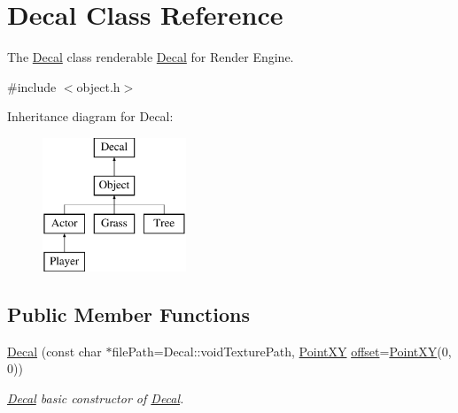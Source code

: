 \hypertarget{classDecal}{}\section{Decal Class Reference}
\label{classDecal}


The \hyperlink{classDecal}{Decal} class renderable \hyperlink{classDecal}{Decal} for Render Engine.  




{\ttfamily \#include $<$object.\+h$>$}

Inheritance diagram for Decal\+:\begin{figure}[H]
\begin{center}
\leavevmode
\includegraphics[height=4.000000cm]{classDecal}
\end{center}
\end{figure}
\subsection*{Public Member Functions}
\begin{DoxyCompactItemize}
\item 
\hyperlink{classDecal_aea7ec36355a8c52f05bfcdeb2a7afd39}{Decal} (const char $\ast$file\+Path=Decal\+::void\+Texture\+Path, \hyperlink{classPointXY}{Point\+X\+Y} \hyperlink{classDecal_a9db398b189cffe1f8770f8bce5b8af71}{offset}=\hyperlink{classPointXY}{Point\+X\+Y}(0, 0))
\begin{DoxyCompactList}\small\item\em \hyperlink{classDecal}{Decal} basic constructor of \hyperlink{classDecal}{Decal}. \end{DoxyCompactList}\end{DoxyCompactItemize}
